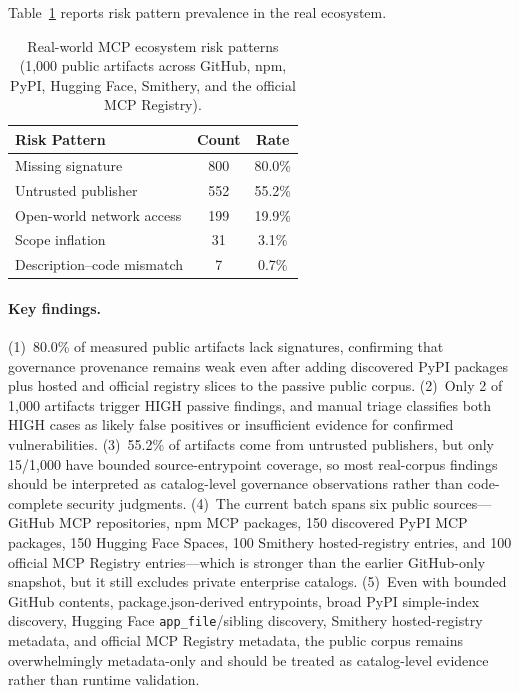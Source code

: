 \documentclass[10pt]{article}
\begin{document}
Table~\ref{tab:real_ecosystem} reports risk pattern prevalence in the real ecosystem.

\begin{table}[t]
\centering
\caption{Real-world MCP ecosystem risk patterns (1{,}000 public artifacts across GitHub, npm, PyPI, Hugging Face, Smithery, and the official MCP Registry).}
\label{tab:real_ecosystem}
\begin{tabular}{lcc}
\toprule
Risk Pattern & Count & Rate \\
\midrule
Missing signature & 800 & 80.0\% \\
Untrusted publisher & 552 & 55.2\% \\
Open-world network access & 199 & 19.9\% \\
Scope inflation & 31 & 3.1\% \\
Description--code mismatch & 7 & 0.7\% \\
\bottomrule
\end{tabular}
\end{table}

\paragraph{Key findings.}
(1)~80.0\% of measured public artifacts lack signatures, confirming that governance provenance remains weak even after adding discovered PyPI packages plus hosted and official registry slices to the passive public corpus.
(2)~Only 2 of 1{,}000 artifacts trigger HIGH passive findings, and manual triage classifies both HIGH cases as likely false positives or insufficient evidence for confirmed vulnerabilities.
(3)~55.2\% of artifacts come from untrusted publishers, but only 15/1{,}000 have bounded source-entrypoint coverage, so most real-corpus findings should be interpreted as catalog-level governance observations rather than code-complete security judgments.
(4)~The current batch spans six public sources—GitHub MCP repositories, npm MCP packages, 150 discovered PyPI MCP packages, 150 Hugging Face Spaces, 100 Smithery hosted-registry entries, and 100 official MCP Registry entries—which is stronger than the earlier GitHub-only snapshot, but it still excludes private enterprise catalogs.
(5)~Even with bounded GitHub contents, package.json-derived entrypoints, broad PyPI simple-index discovery, Hugging Face \texttt{app\_file}/sibling discovery, Smithery hosted-registry metadata, and official MCP Registry metadata, the public corpus remains overwhelmingly metadata-only and should be treated as catalog-level evidence rather than runtime validation.
\end{document}
